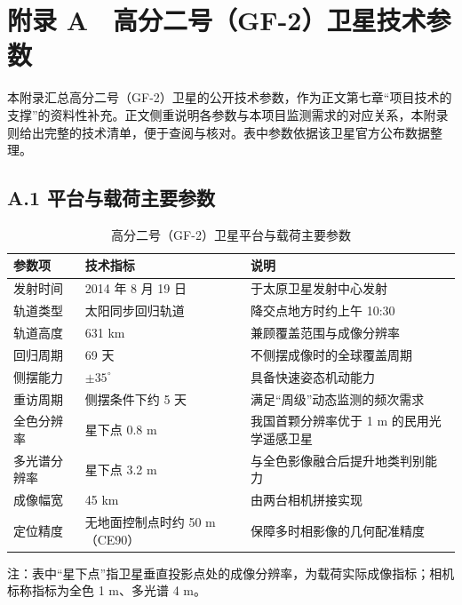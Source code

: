 \setcounter{table}{0}
\renewcommand{\thetable}{A-\arabic{table}}

\section{附录 A　高分二号（GF-2）卫星技术参数}

本附录汇总高分二号（GF-2）卫星的公开技术参数，作为正文第七章“项目技术的支撑”的资料性补充。正文侧重说明各参数与本项目监测需求的对应关系，本附录则给出完整的技术清单，便于查阅与核对。表中参数依据该卫星官方公布数据整理。

\subsection{A.1 平台与载荷主要参数}

\begin{table}[htbp]
    \centering
    \caption{高分二号（GF-2）卫星平台与载荷主要参数}
    \label{tab:gf2-platform}
    \small
    \begin{tabular}{|p{3.4cm}|p{5.4cm}|p{4.6cm}|}
        \hline
        \textbf{参数项} & \textbf{技术指标} & \textbf{说明} \\
        \hline
        发射时间 & 2014 年 8 月 19 日 & 于太原卫星发射中心发射 \\
        \hline
        轨道类型 & 太阳同步回归轨道 & 降交点地方时约上午 10:30 \\
        \hline
        轨道高度 & 631 km & 兼顾覆盖范围与成像分辨率 \\
        \hline
        回归周期 & 69 天 & 不侧摆成像时的全球覆盖周期 \\
        \hline
        侧摆能力 & $\pm35^{\circ}$ & 具备快速姿态机动能力 \\
        \hline
        重访周期 & 侧摆条件下约 5 天 & 满足“周级”动态监测的频次需求 \\
        \hline
        全色分辨率 & 星下点 0.8 m & 我国首颗分辨率优于 1 m 的民用光学遥感卫星 \\
        \hline
        多光谱分辨率 & 星下点 3.2 m & 与全色影像融合后提升地类判别能力 \\
        \hline
        成像幅宽 & 45 km & 由两台相机拼接实现 \\
        \hline
        定位精度 & 无地面控制点时约 50 m（CE90） & 保障多时相影像的几何配准精度 \\
        \hline
    \end{tabular}
    \par\vspace{2pt}
    {\footnotesize 注：表中“星下点”指卫星垂直投影点处的成像分辨率，为载荷实际成像指标；相机标称指标为全色 1 m、多光谱 4 m。}
\end{table}

